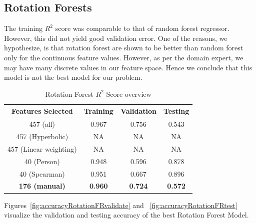 \documentclass[11pt]{article}
\begin{document}
\subsection{Rotation Forests}

The training $R^2$ score was comparable to that of random forest regressor.
However, this did not yield good validation error.
One of the reasons,  we hypothesize,  is that rotation forest are shown to be better than random forest only for the continuous feature values.
However,  as per the domain expert,  we may have many discrete values in our feature space.
Hence we conclude that this model is not the best model for our problem.

\begin{table} [h!]
\centering
 \begin{tabular}{ | c | c | c | c | }
\hline
\textbf{Features Selected} & \textbf{Training} & \textbf{Validation} & \textbf{Testing} \\ [0.5 ex]
\hline \hline
457 (all) & 0.967 & 0.756 & 0.543\\
457 (Hyperbolic) & NA & NA & NA\\
457 (Linear weighting) & NA & NA & NA\\
40 (Person) & 0.948 & 0.596 & 0.878\\
40 (Spearman) & 0.951 & 0.667 &0.896 \\
\textbf{176 (manual)} & \textbf{0.960} & \textbf{0.724} & \textbf{0.572} \\ [1ex]
\hline
\end{tabular}
\caption{Rotation Forest $R^2$ Score overview}
\label {table:4}
\end{table}

Figures~\ref{fig:accuracyRotationFRvalidate} and ~\ref{fig:accuracyRotationFRtest} visualize the validation and testing accuracy of the best Rotation Forest Model.
\end{document}
